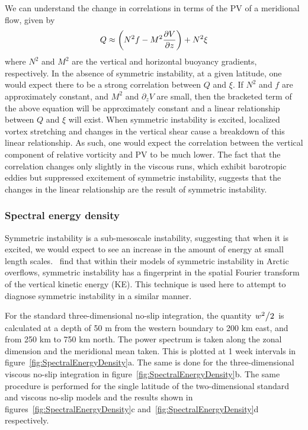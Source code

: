     We can understand the change in correlations in terms of the PV of a meridional flow, given by
    \begin{equation}
        Q \approx \bigg(N^2 f - M^2 \pdv{V}{z} \bigg) + N^2 \xi
    \end{equation}
    where $N^2$ and $M^2$ are the vertical and horizontal buoyancy gradients, respectively. In the absence of symmetric instability, at a given latitude, one would expect there to be a strong correlation between $Q$ and $\xi$. If $N^2$ and $f$ are approximately constant, and $M^2$ and $\partial_z V$ are small, then the bracketed term of the above equation will be approximately constant and a linear relationship between $Q$ and $\xi$ will exist. When symmetric instability is excited, localized vortex stretching and changes in the vertical shear cause a breakdown of this linear relationship. As such, one would expect the correlation between the vertical component of relative vorticity and PV to be much lower. The fact that the correlation changes only slightly in the viscous runs, which exhibit barotropic eddies but suppressed excitement of symmetric instability, suggests that the changes in the linear relationship are the result of symmetric instability.

    \subsubsection{Spectral energy density}
    Symmetric instability is a sub-mesoscale instability, suggesting that when it is excited, we would expect to see an increase in the amount of energy at small length scales.~\citet{Yankovsky2019} find that within their models of symmetric instability in Arctic overflows, symmetric instability has a fingerprint in the spatial Fourier transform of the vertical kinetic energy (KE). This technique is used here to attempt to diagnose symmetric instability in a similar manner.
    
    For the standard three-dimensional no-slip integration, the quantity $\flatfrac{w^2}{2}$ is calculated at a depth of 50 m from the western boundary to 200 km east, and from 250 km to 750 km north. The power spectrum is taken along the zonal dimension and the meridional mean taken. This is plotted at 1 week intervals in figure~\ref{fig:SpectralEnergyDensity}a. The same is done for the three-dimensional viscous no-slip integration in figure~\ref{fig:SpectralEnergyDensity}b. The same procedure is performed for the single latitude of the two-dimensional standard and viscous no-slip models and the results shown in figures~\ref{fig:SpectralEnergyDensity}c and~\ref{fig:SpectralEnergyDensity}d respectively.

